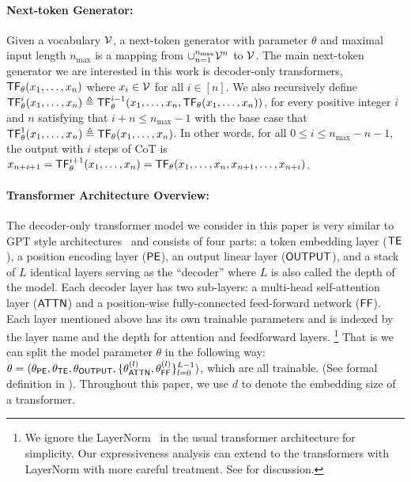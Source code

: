 \paragraph{Next-token Generator:}  Given a vocabulary ${\mathcal{V}}$, a next-token generator with parameter $\theta$ and maximal input length $n_{\max}$ is a mapping from $\cup_{n=1}^{n_{\max}} {\mathcal{V}}^n$ to ${\mathcal{V}}$. The main next-token generator we are interested in this work is decoder-only transformers, $\mathsf{TF}_\theta(x_1,\ldots,x_n)$ where $x_i\in {\mathcal{V}}$ for all $i\in[ n]$.  We also recursively define $\mathsf{TF}^{i}_\theta(x_1,\ldots,x_n)\triangleq \mathsf{TF}^{i-1}_\theta(x_1,\ldots,x_n, \mathsf{TF}_\theta(x_1,\ldots,x_n))$, for every positive integer $i$ and $n$ satisfying that $i+n\le n_{\max}-1$ with the base case that $\mathsf{TF}^{1}_\theta(x_1,\ldots,x_n)\triangleq\mathsf{TF}_\theta(x_1,\ldots,x_n)$. In other words, for all $0\le i\le n_{\max} - n-1$, the output with $i$ steps of CoT is
$x_{n+i+1}  = \mathsf{TF}^{i+1}_\theta(x_1,\ldots,x_n) = \mathsf{TF}_\theta(x_1,\ldots,x_n,x_{n+1},\ldots,x_{n+i})$.



\paragraph{Transformer Architecture Overview:}
The decoder-only transformer model we consider in this paper is very similar to GPT style architectures~\citep{radford2019language} and consists of four parts:  a token embedding layer ($\mathsf{TE}$), a position encoding layer ($\mathsf{PE}$), an output linear layer ($\mathsf{OUTPUT}$), and a stack of $L$ identical layers serving as the ``decoder'' where $L$ is also called the depth of the model. Each decoder layer has two sub-layers: a multi-head self-attention layer ($\mathsf{ATTN}$) and a position-wise fully-connected feed-forward network ($\mathsf{FF}$). Each layer mentioned above has its own trainable parameters and is indexed by the layer name and the depth for attention and feedforward layers.
 \footnote{We ignore the LayerNorm~\citep{ba2016layer} in the usual transformer architecture for simplicity. Our expressiveness analysis can extend to the transformers with LayerNorm with more careful treatment. See  for discussion.}
That is we can split the model parameter $\theta$ in the following way: $\theta = (\theta_{\mathsf{PE}},\theta_{\mathsf{TE}},\theta_{\mathsf{OUTPUT}},\{\theta^{(l)}_{\mathsf{ATTN}},\theta^{(l)}_{\mathsf{FF}}\}_{l=0}^{L-1} )$, which are all trainable. (See formal definition in ). Throughout this paper, we use $d$ to denote the embedding size of a transformer.


